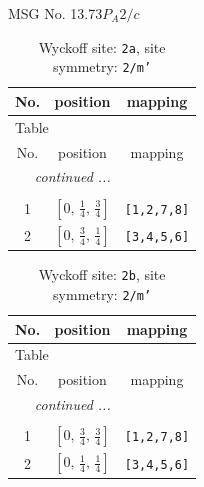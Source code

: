 \documentclass[fleqn,8pt]{jsarticle}
\begin{document}
\setcounter{MaxMatrixCols}{32}

\renewcommand{\tablename}{Table~}
\renewcommand{\figurename}{Figure~}
\begin{center}
\LARGE
MSG No. 13.73\quad$P_{A}2/c$
\end{center}
\renewcommand{\arraystretch}{1.2}
\begin{longtable}{ccc}
\caption{Wyckoff site: {\tt 2a}, site symmetry: {\tt 2/m'}}
 \\
 \hline \hline
No. & position & mapping \\ \hline \endfirsthead

\multicolumn{2}{l}{\tablename\ \thetable{}} \\
 \hline \hline
No. & position & mapping \\ \hline \endhead

 \hline \hline
\multicolumn{2}{r}{\footnotesize\it continued ...} \\ \endfoot

 \hline \hline
\multicolumn{2}{r}{} \\ \endlastfoot

1 & $\left[ 0,\, \frac{1}{4},\, \frac{3}{4} \right]$ & {\tt [1,2,7,8]} \\ \hline
2 & $\left[ 0,\, \frac{3}{4},\, \frac{1}{4} \right]$ & {\tt [3,4,5,6]} \\
\end{longtable}
\renewcommand{\arraystretch}{1.2}
\begin{longtable}{ccc}
\caption{Wyckoff site: {\tt 2b}, site symmetry: {\tt 2/m'}}
 \\
 \hline \hline
No. & position & mapping \\ \hline \endfirsthead

\multicolumn{2}{l}{\tablename\ \thetable{}} \\
 \hline \hline
No. & position & mapping \\ \hline \endhead

 \hline \hline
\multicolumn{2}{r}{\footnotesize\it continued ...} \\ \endfoot

 \hline \hline
\multicolumn{2}{r}{} \\ \endlastfoot

1 & $\left[ 0,\, \frac{3}{4},\, \frac{3}{4} \right]$ & {\tt [1,2,7,8]} \\ \hline
2 & $\left[ 0,\, \frac{1}{4},\, \frac{1}{4} \right]$ & {\tt [3,4,5,6]} \\
\end{longtable}
\end{document}
